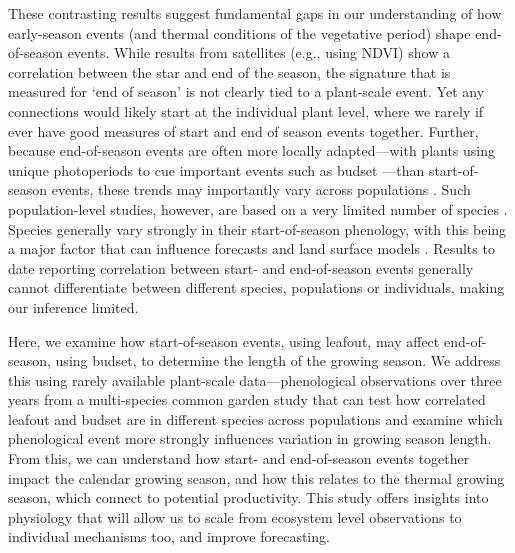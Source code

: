\documentclass{article}[12pt]
\begin{document}
These contrasting results suggest fundamental gaps in our understanding of how early-season events (and thermal conditions of the vegetative period) shape end-of-season events. While results from satellites (e.g., using NDVI) show a correlation between the star and end of the season, the signature that is measured for `end of season' is not clearly tied to a plant-scale event. Yet any connections would likely start at the individual plant level, where we rarely if ever have good measures of start and end of season events together. Further, because end-of-season events are often more locally adapted---with plants using unique photoperiods to cue important events such as budset \citep{bauerle2012photoperiodic,soolanayakanahally2013timing}---than start-of-season events, these trends may importantly vary across populations \citep{aitken2016}. Such population-level studies, however, are based on a very limited number of species \citep{Zeng2024}. Species generally vary strongly in their start-of-season phenology, with this being a major factor that can influence forecasts \citep{Morales-Castilla2024} and land surface models \citep{ma2022}. Results to date reporting correlation between start- and end-of-season events generally cannot differentiate between different species, populations or individuals, making our inference limited. 

Here, we examine how start-of-season events, using leafout, may affect end-of-season, using budset, to determine the length of the growing season.
We address this using rarely available plant-scale data---phenological observations over three years from a multi-species common garden study that can test how correlated leafout and budset are in different species across populations and examine which phenological event more strongly influences variation in growing season length. From this, we can understand how start- and end-of-season events together impact the calendar growing season, and how this relates to the thermal growing season, which connect to potential productivity. This study offers insights into physiology that will allow us to scale from ecosystem level observations to individual mechanisms too, and improve forecasting. %
\end{document}
